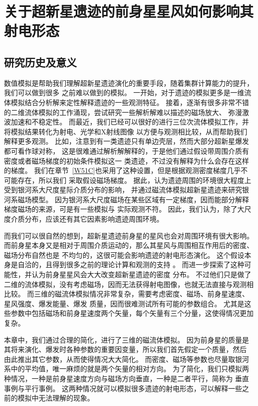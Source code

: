 \chapter{关于超新星遗迹的前身星星风如何影响其射电形态}
\label{SW}

\section{研究历史及意义}
\label{SWintro}
数值模拟是帮助我们理解超新星遗迹演化的重要手段，随着集群计算能力的提升，我们可以做到很多
之前难以做到的模拟。
一开始，对于遗迹的模拟更多是一维流体模拟结合分析解来定性解释遗迹的一些观测特征。
接着，逐渐有很多非常不错的二维流体模拟的工作涌现，尝试研究一些解析解难以描述的磁场放大、
弥漫激波加速和不稳定性\citep{Jun1996,Kang2006,Fang2012}。
而最近，我们已经可以很好的进行三位次流体模拟工作，并将模拟结果转化为射电、光学和X射线图像
以方便与观测相比较\citep{Orlando2007,Meyer2015,Zhang2017}，从而帮助我们解释更多观测。
比如，\citet{Orlando2007}注意到有一类遗迹只有单边壳层，然而大部分超新星爆发都可看作球对称，
这是很难通过解析解解释的，于是他们通过假设带周围介质有密度或者磁场梯度的初始条件模拟这一
类遗迹，不过没有解释为什么会存在这样的梯度。
我们在章节~\ref{W51C}也采用了这种设置，但是根据观测密度梯度几乎不可能存在，所以我们
采取假设磁场梯度。
据此，\citet{West2016}认为遗迹周围的环境很大程度上受到银河系大尺度星际介质分布的影响，
并通过磁流体模拟超新星遗迹来研究银河系磁场模型。
因为银河系大尺度磁场在某些区域有一定梯度，因而能部分解释梯度磁场的来源，可是有一些模拟与
实际观测不符。
因此，我们认为，除了大尺度介质分布，应该还有其它因素影响遗迹周围环境。

而我们可以很自然的想到，超新星遗迹前身星的星风也会对周围环境有很大影响。
而前身星本身又是相对于周围介质运动的，那么其星风与周围相互作用后的密度、磁场分布自然也是
不均匀的，这很可能会影响遗迹的射电形态演化。
这个假设本身是自洽的，且得到很多之前的理论计算和观测的支持
\citep{Chevalier1989,Chen1995,Zhang1996,Foster2004,Lee2010}。
而\citet{Meyer2015}进一步探索了这种可能性，并认为前身星星风会大大改变超新星遗迹的密度
分布。
不过他们只是做了二维的流体模拟，没有考虑磁场，因而无法获得射电图像，也就无法直接与观测相
比较。
而三维的磁流体模拟情况非常复杂，需要考虑密度、磁场、前身星速度、星风强度、爆发能量、爆发
质量，因而很难测试所有可能的参数组合。
尤其是这些参数中包括磁场和前身星速度两个矢量，每个矢量有三个分量，这使得情况更加复杂。

本章中，我们通过合理的简化，进行了三维的磁流体模拟。
因为前身星的质量是其将来演化、爆发时各种参数的重要因变量，所以我们首先假定一个质量，然后
由此推出其它参数，从而使得情况大大简化。
而密度、磁场等参数也尽量取银河系中的平均值，唯一麻烦的就是两个矢量的相对方向。
为了简化，我们只模拟两种情况，一种是前身星速度方向与磁场方向垂直，一种是二者平行，简称为
垂直事例与平行事例。
这两种情况就可以模拟很多遗迹的射电形态，可以解释一些之前的模拟中无法理解的现象。


